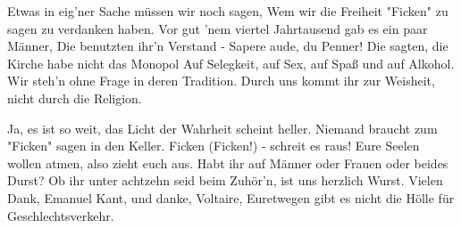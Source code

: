 \begin{guitar}
	Etwas in eig'ner Sache müssen wir noch sagen,
	Wem wir die Freiheit "Ficken" zu sagen zu verdanken haben.
	Vor gut 'nem viertel Jahrtausend gab es ein paar Männer,
	Die benutzten ihr'n Verstand - Sapere aude, du Penner!
	Die sagten, die Kirche habe nicht das Monopol
	Auf Selegkeit, auf Sex, auf Spaß und auf Alkohol.
	Wir steh'n ohne Frage in deren Tradition.
	Durch uns kommt ihr zur Weisheit, nicht durch die Religion.
	
	Ja, es ist so weit, das Licht der Wahrheit scheint heller.
	Niemand braucht zum "Ficken" sagen in den Keller.
	Ficken (Ficken!) - schreit es raus!
	Eure Seelen wollen atmen, also zieht euch aus.
	Habt ihr auf Männer oder Frauen oder beides Durst?
	Ob ihr unter achtzehn seid beim Zuhör'n, ist uns herzlich Wurst.
	Vielen Dank, Emanuel Kant, und danke, Voltaire,
	Euretwegen gibt es nicht die Hölle für Geschlechtsverkehr.
	
	 
\end{guitar}
